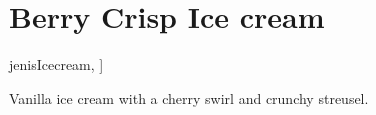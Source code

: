 \section[Berry Crisp]{Berry Crisp Ice cream}

\begin{recipestats}[
        servings=16,
        preptime=15~\minute,
        bakingtime=45~\minute,
        inactivetime=4~\hour,
        original=\citetitle{jenisIcecream}~\cite[p.~148]{jenisIcecream},
    ]
\end{recipestats}

\begin{recipeabstract}
    Vanilla ice cream with a cherry swirl and crunchy streusel.
\end{recipeabstract}

\begin{ingredientcolumns}
    \begin{ingredientblock}
        \\
        \\
        \\
    \end{ingredientblock}
    \begin{ingredientblock}
        \\
        \\
        \\
    \end{ingredientblock}
\end{ingredientcolumns}

